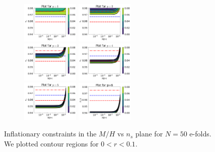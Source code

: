 \documentclass[amssymb,twocolumn,prd,nofootinbib,showpacs]{revtex4-1}
\begin{document}
\begin{figure}[h!]
\raggedright
\begin{subfigure}[b]{0.6\textwidth}
\includegraphics[width=0.3\textwidth]{p150.png}
\includegraphics[width=0.3\textwidth]{p250.png}\\
\includegraphics[width=0.3\textwidth]{p350.png}
\includegraphics[width=0.3\textwidth]{p450.png}\\
\includegraphics[width=0.3\textwidth]{p550.png}
\includegraphics[width=0.3\textwidth]{p650.png}
\end{subfigure}
\caption{Inflationary constraints in the $M/H$ vs $n_s$ plane for $N=50$ e-folds. We plotted contour regions for $0<r<0.1$.}

\end{figure}
\end{document}
